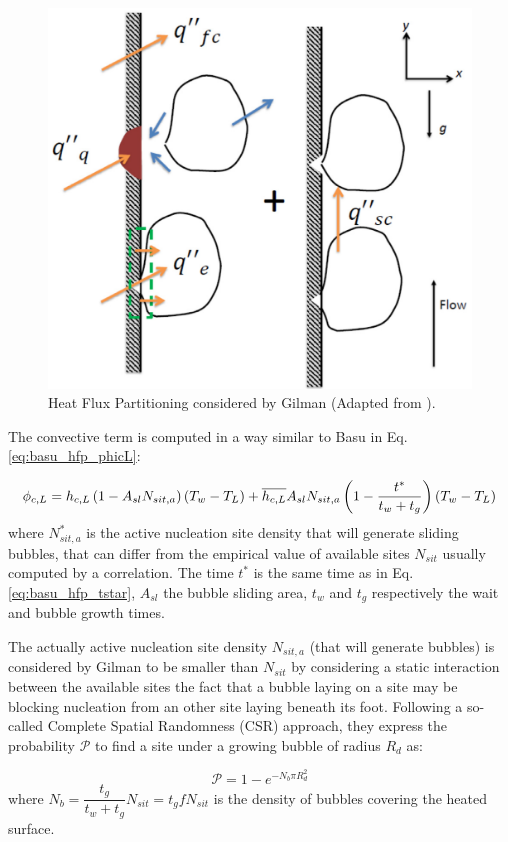 \begin{figure}[!h]
\centering
\includegraphics[width=0.6\linewidth]{img/HFP/Gilman/hfp_model.PNG}
\caption{Heat Flux Partitioning considered by Gilman \cite{gilman_development_2014} (Adapted from \cite{gilman_self-consistent_2017}).}
\label{fig:gilman_hfp}
\end{figure}


The convective term is computed in a way similar to Basu \etal \cite{basu_wall_2005} in Eq. \ref{eq:basu_hfp_phicL}:

\begin{equation}
\phi_{c,L} = h_{c,L}\left( 1-A_{sl}N_{sit,a} \right)\left( T_{w}-T_{L} \right) + \overline{h_{c,L}}A_{sl}N_{sit,a}\left( 1 - \frac{t^{*}}{t_{w}+t_{g}} \right)\left( T_{w}-T_{L} \right)
\label{eq:gilman_hfp_phicL}
\end{equation}
where $N_{sit,a}^{*}$ is the active nucleation site density that will generate sliding bubbles, that can differ from the empirical value of available sites $N_{sit}$ usually computed by a correlation. The time $t^{*}$ is the same time as in Eq. \ref{eq:basu_hfp_tstar}, $A_{sl}$ the bubble sliding area, $t_{w}$ and $t_{g}$ respectively the wait and bubble growth times.

\npar

The actually active nucleation site density $N_{sit,a}$ (that will generate bubbles) is considered by Gilman to be smaller than $N_{sit}$ by considering a static interaction between the available sites \ie the fact that a bubble laying on a site may be blocking nucleation from an other site laying beneath its foot. Following a so-called Complete Spatial Randomness (CSR) approach, they express the probability $\mathcal{P}$ to find a site under a growing bubble of radius $R_{d}$ as:

\begin{equation}
\mathcal{P} = 1-e^{-N_{b}\pi R_{d}^{2}}
\label{eq:gilman_hfp_pinter}
\end{equation} 
where $N_{b} = \dfrac{t_{g}}{t_{w}+t_{g}}N_{sit} = t_{g} f N_{sit}$ is the density of bubbles covering the heated surface.

